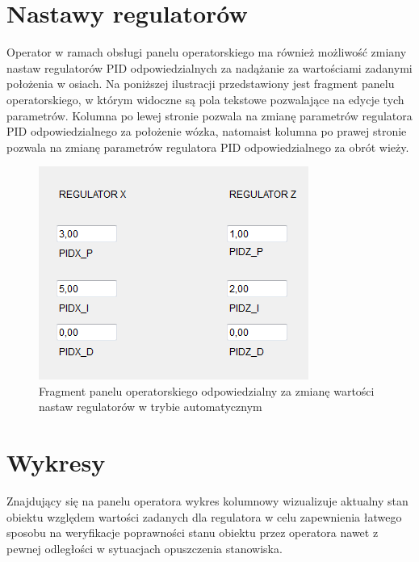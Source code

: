 \documentclass{mwrep}
\begin{document}
\section{Nastawy regulatorów}
\label{MAPS::Nastawy}

Operator w ramach obsługi panelu operatorskiego ma również możliwość zmiany nastaw regulatorów PID odpowiedzialnych za nadążanie za wartościami zadanymi położenia w osiach. Na poniższej ilustracji przedstawiony jest fragment panelu operatorskiego, w którym widoczne są pola tekstowe pozwalające na edycje tych parametrów. Kolumna po lewej stronie pozwala na zmianę parametrów regulatora PID odpowiedzialnego za położenie wózka, natomaist kolumna po prawej stronie pozwala na zmianę parametrów regulatora PID odpowiedzialnego za obrót wieży.

\begin{figure}[H]
    \label{MAPS::PanelOperatorski}
    \centering
    \includegraphics[scale=0.8]{nastawy.png}
    \caption{Fragment panelu operatorskiego odpowiedzialny za zmianę wartości nastaw regulatorów w trybie automatycznym }
\end{figure}


\section{Wykresy}
\label{MAPS::Wykresy}

Znajdujący się na panelu operatora wykres kolumnowy wizualizuje aktualny stan obiektu względem wartości zadanych dla regulatora w celu zapewnienia łatwego sposobu na weryfikacje poprawności stanu obiektu przez operatora nawet z pewnej odległości w sytuacjach opuszczenia stanowiska. 
\end{document}
